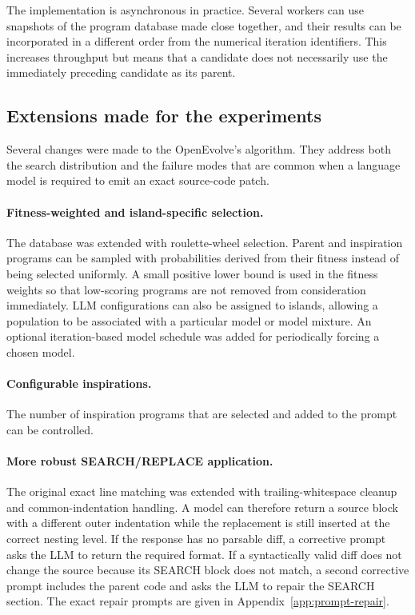 The implementation is asynchronous in practice. Several workers can use
snapshots of the program database made close together, and their results can be incorporated in a
different order from the numerical iteration identifiers. This increases
throughput but means that a candidate does not necessarily use the immediately
preceding candidate as its parent.

\subsection{Extensions made for the experiments}

Several changes were made to the OpenEvolve's algorithm. They address
both the search distribution and the failure modes that are common when a
language model is required to emit an exact source-code patch.

\paragraph{Fitness-weighted and island-specific selection.}
The database was extended with roulette-wheel selection. Parent and inspiration
programs can be sampled with probabilities derived from their fitness instead
of being selected uniformly. A small positive lower bound is used in the
fitness weights so that low-scoring programs are not removed from consideration
immediately. LLM configurations can also be assigned to islands, allowing a
population to be associated with a particular model or model mixture. An
optional iteration-based model schedule was added for periodically forcing a
chosen model.

\paragraph{Configurable inspirations.}
The number of inspiration programs that are selected and added to the prompt can be controlled.

\paragraph{More robust SEARCH/REPLACE application.}
The original exact line matching was extended with trailing-whitespace cleanup
and common-indentation handling. A model can therefore return a source block
with a different outer indentation while the replacement is still inserted at
the correct nesting level. If the response has no parsable diff, a corrective prompt asks the
LLM to return the required format. If a syntactically valid diff does not
change the source because its SEARCH block does not match, a second corrective
prompt includes the parent code and asks the LLM to repair the SEARCH section.
The exact repair prompts are given in Appendix~\ref{app:prompt-repair}.

